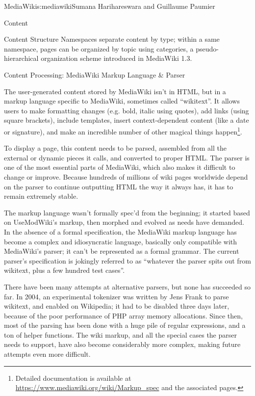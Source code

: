 \begin{aosachapter}{MediaWiki}{s:mediawiki}{Sumana Harihareswara and Guillaume Paumier}
\begin{aosasect1}{Content}
\begin{aosasect2}{Content Structure}
Namespaces separate content by type; within a same namespace, pages
can be organized by topic using categories, a pseudo-hierarchical
organization scheme introduced in MediaWiki 1.3.

\end{aosasect2}

\begin{aosasect2}{Content Processing: MediaWiki Markup Language \& Parser}

The user-generated content stored by MediaWiki isn't in HTML, but in a
markup language specific to MediaWiki, sometimes called ``wikitext''. It
allows users to make formatting changes (e.g. bold, italic using
quotes), add links (using square brackets), include templates, insert
context-dependent content (like a date or signature), and make an
incredible number of other magical things happen\footnote{Detailed
  documentation is available at
  \url{https://www.mediawiki.org/wiki/Markup\_spec} and the associated
  pages.}.

To display a page, this content needs to be parsed, assembled from all
the external or dynamic pieces it calls, and converted to proper
HTML. The parser is one of the most essential parts of MediaWiki,
which also makes it difficult to change or improve. Because hundreds
of millions of wiki pages worldwide depend on the parser to continue
outputting HTML the way it always has, it has to remain extremely
stable.

The markup language wasn't formally spec'd from the beginning; it
started based on UseModWiki's markup, then morphed and evolved as
needs have demanded. In the absence of a formal specification, the
MediaWiki markup language has become a complex and idiosyncratic
language, basically only compatible with MediaWiki's parser; it can't
be represented as a formal grammar. The current parser's specification
is jokingly referred to as ``whatever the parser spits out from
wikitext, plus a few hundred test cases''.

There have been many attempts at alternative parsers, but none has
succeeded so far. In 2004, an experimental tokenizer was written by
Jens Frank to parse wikitext, and enabled on Wikipedia; it had to be
disabled three days later, because of the poor performance of PHP
array memory allocations. Since then, most of the parsing has been
done with a huge pile of regular expressions, and a ton of helper
functions. The wiki markup, and all the special cases the parser needs
to support, have also become considerably more complex, making future
attempts even more difficult.


\end{aosasect2}
\end{aosasect1}
\end{aosachapter}
